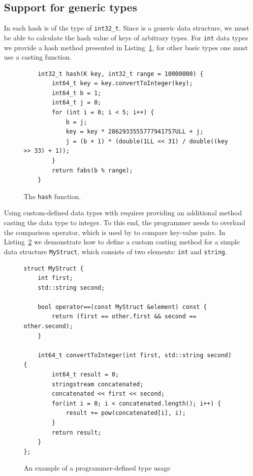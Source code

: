 \subsection{Support for generic types} 

    In \NvmHashMap each hash is of the type of \texttt{int32\_t}. 
    Since \NvmHashMap is a generic data structure, we must be able to calculate the hash value of keys of arbitrary types.
    For \texttt{int} data types we provide a hash method \cite{Hashing} presented in Listing~\ref{Hash}, for other basic types one must use a casting function. 
    
    \begin{figure}[ht]
\renewcommand{\figurename}{Listing}
\begin{lstlisting}
    int32_t hash(K key, int32_t range = 10000000) {
        int64_t key = key.convertToInteger(key);
        int64_t b = 1;
        int64_t j = 0;
        for (int i = 0; i < 5; i++) {
            b = j;
            key = key * 2862933555777941757ULL + j;
            j = (b + 1) * (double(1LL << 31) / double((key >> 33) + 1));
        }
        return fabs(b % range);
    }
\end{lstlisting}
\caption{The \texttt{hash} function.}
\label{Hash}
\end{figure}

    Using custom-defined data types with \NvmHashMap requires providing an additional method casting the data type to integer.
    To this end, the programmer needs to overload the comparison operator, which is used by \NvmHashMap to compare key-value pairs. 
    In Listing~\ref{StdHashOverload} we demonstrate how to define a custom casting method for a simple data structure \texttt{MyStruct}, which consists of two elements: \texttt{int} and \texttt{string}. 
    
    
\begin{figure}[ht]
\renewcommand{\figurename}{Listing}
\begin{lstlisting}
struct MyStruct {
    int first;
    std::string second;
    
    bool operator==(const MyStruct &element) const {
        return (first == other.first && second == other.second);
    }
    
    int64_t convertToInteger(int first, std::string second) {
        int64_t result = 0;
        stringstream concatenated;
        concatenated << first << second;
        for(int i = 0; i < concatenated.length(); i++) {
            result += pow(concatenated[i], i);
        }
        return result;
    }
};
\end{lstlisting}
\caption{An example of a programmer-defined type usage}
\label{StdHashOverload}
\end{figure}

